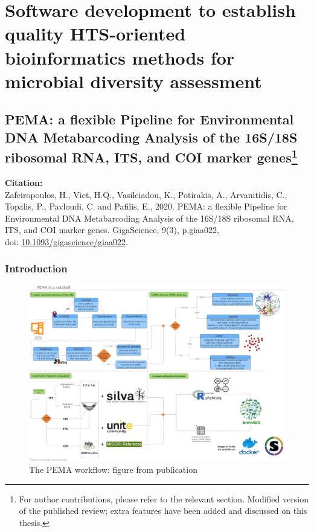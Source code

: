 % 
% 

\chapter{Software development to establish quality HTS-oriented bioinformatics methods for microbial diversity assessment}
\label{cha:2}



\section[PEMA: a flexible Pipeline for Environmental DNA Metabarcoding Analysis of the 16S/18S ribosomal RNA, ITS, and COI marker genes]{
   PEMA: a flexible Pipeline for Environmental DNA Metabarcoding Analysis of the 16S/18S ribosomal RNA, ITS, and COI marker genes\footnote{For author contributions, please refer to the relevant section. Modified version of the published review; extra features have been added and discussed on this thesis.}
}

   \textbf{Citation:} \\ 
   Zafeiropoulos, H., Viet, H.Q., Vasileiadou, K., Potirakis, A., Arvanitidis, C., Topalis, P., Pavloudi, C. and Pafilis, E., 2020. PEMA: a flexible Pipeline for Environmental DNA Metabarcoding Analysis of the 16S/18S ribosomal RNA, ITS, and COI marker genes. GigaScience, 9(3), p.giaa022, \\ 
   doi: \href{https://doi.org/10.1093/gigascience/giaa022}{10.1093/gigascience/giaa022}.


   \subsection{Introduction}


      \begin{figure}[ht]
         \centering
         \includegraphics[width=0.95\columnwidth]{figures/pema_workflow.jpeg}
         \caption{The PEMA workflow: figure from publication}
      \end{figure}


